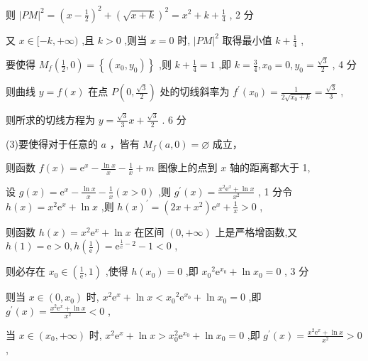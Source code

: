 \documentclass[10pt]{article}
\begin{document}
则 \({\left| PM\right| }^{2} = {\left( x - \frac{1}{2}\right) }^{2} + {\left( \sqrt{x + k}\right) }^{2} = {x}^{2} + k + \frac{1}{4}\) , 2 分

又 \(x \in  \lbrack  - k, + \infty )\) ,且 \(k > 0\) ,则当 \(x = 0\) 时, \({\left| PM\right| }^{2}\) 取得最小值 \(k + \frac{1}{4}\) ,

要使得 \({M}_{f}\left( {\frac{1}{2},0}\right)  = \left\{  \left( {{x}_{0},{y}_{0}}\right) \right\}\) ,则 \(k + \frac{1}{4} = 1\) ,即 \(k = \frac{3}{4},{x}_{0} = 0,{y}_{0} = \frac{\sqrt{3}}{2}\) , 4 分

则曲线 \(y = f\left( x\right)\) 在点 \(P\left( {0,\frac{\sqrt{3}}{2}}\right)\) 处的切线斜率为 \({f}^{\prime }\left( {x}_{0}\right)  = \frac{1}{2\sqrt{{x}_{0} + k}} = \frac{\sqrt{3}}{3}\) ,

则所求的切线方程为 \(y = \frac{\sqrt{3}}{3}x + \frac{\sqrt{3}}{2}\) . 6 分

(3)要使得对于任意的 \(a\) ，皆有 \({M}_{f}\left( {a,0}\right)  = \varnothing\) 成立，

则函数 \(f\left( x\right)  = {\mathrm{e}}^{x} - \frac{\ln x}{x} - \frac{1}{x} + m\) 图像上的点到 \(x\) 轴的距离都大于 1,

设 \(g\left( x\right)  = {\mathrm{e}}^{x} - \frac{\ln x}{x} - \frac{1}{x}\left( {x > 0}\right)\) ,则 \({g}^{\prime }\left( x\right)  = \frac{{x}^{2}{\mathrm{e}}^{x} + \ln x}{{x}^{2}}\) , 1 分令 \(h\left( x\right)  = {x}^{2}{\mathrm{e}}^{x} + \ln x\) ,则 \(h{\left( x\right) }^{\prime } = \left( {{2x} + {x}^{2}}\right) {\mathrm{e}}^{x} + \frac{1}{x} > 0\) ,

则函数 \(h\left( x\right)  = {x}^{2}{\mathrm{e}}^{x} + \ln x\) 在区间 \(\left( {0, + \infty }\right)\) 上是严格增函数,又 \(h\left( 1\right)  = \mathrm{e} > 0,h\left( \frac{1}{\mathrm{e}}\right)  = {\mathrm{e}}^{\frac{1}{\mathrm{e}} - 2} - 1 < 0\) ,

则必存在 \({x}_{0} \in  \left( {\frac{1}{\mathrm{e}},1}\right)\) ,使得 \(h\left( {x}_{0}\right)  = 0\) ,即 \({x}_{0}{}^{2}{\mathrm{e}}^{{x}_{0}} + \ln {x}_{0} = 0\) , 3 分

则当 \(x \in  \left( {0,{x}_{0}}\right)\) 时, \({x}^{2}{\mathrm{e}}^{x} + \ln x < {x}_{0}{}^{2}{\mathrm{e}}^{{x}_{0}} + \ln {x}_{0} = 0\) ,即 \({g}^{\prime }\left( x\right)  = \frac{{x}^{2}{\mathrm{e}}^{x} + \ln x}{{x}^{2}} < 0\) ,

当 \(x \in  \left( {{x}_{0}, + \infty }\right)\) 时, \({x}^{2}{\mathrm{e}}^{x} + \ln x > {x}_{0}^{2}{\mathrm{e}}^{{x}_{0}} + \ln {x}_{0} = 0\) ,即 \({g}^{\prime }\left( x\right)  = \frac{{x}^{2}{\mathrm{e}}^{x} + \ln x}{{x}^{2}} > 0\) ,
\end{document}
